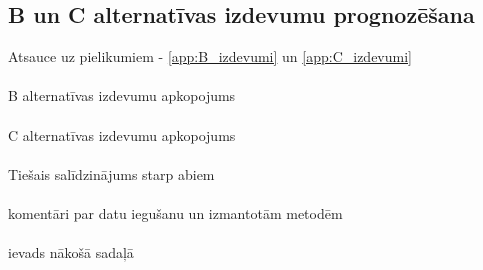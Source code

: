 \subsection{B un C alternatīvas izdevumu prognozēšana}
Atsauce uz pielikumiem - \ref{app:B_izdevumi} un \ref{app:C_izdevumi}
\paragraph{}
B alternatīvas izdevumu apkopojums
\paragraph{}
C alternatīvas izdevumu apkopojums
\paragraph{}
Tiešais salīdzinājums starp abiem
\paragraph{}
komentāri par datu iegušanu un izmantotām metodēm
\paragraph{}
ievads nākošā sadaļā
